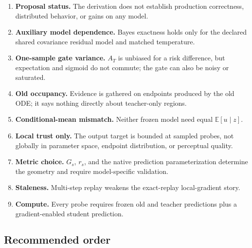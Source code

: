 \documentclass[11pt,a4paper]{article}
\newcommand{\E}{\mathbb{E}}
\theoremstyle{plain}
\theoremstyle{definition}
\begin{document}
\begin{enumerate}[leftmargin=1.6em]
\item \textbf{Proposal status.}  The derivation does not establish production correctness,
      distributed behavior, or gains on any model.
\item \textbf{Auxiliary model dependence.}  Bayes exactness holds only for the declared
      shared covariance residual model and matched temperature.
\item \textbf{One-sample gate variance.}  $A_T$ is unbiased for a risk difference, but expectation
      and sigmoid do not commute; the gate can also be noisy or saturated.
\item \textbf{Old occupancy.}  Evidence is gathered on endpoints produced by the old ODE; it says
      nothing directly about teacher-only regions.
\item \textbf{Conditional-mean mismatch.}  Neither frozen model need equal $\E[u\mid z]$.
\item \textbf{Local trust only.}  The output target is bounded at sampled probes, not globally in
      parameter space, endpoint distribution, or perceptual quality.
\item \textbf{Metric choice.}  $G_s$, $r_s$, and the native prediction parameterization determine
      the geometry and require model-specific validation.
\item \textbf{Staleness.}  Multi-step replay weakens the exact-replay local-gradient story.
\item \textbf{Compute.}  Every probe requires frozen old and teacher predictions plus a
      gradient-enabled student prediction.
\end{enumerate}

\subsection{Recommended order}
\end{document}
